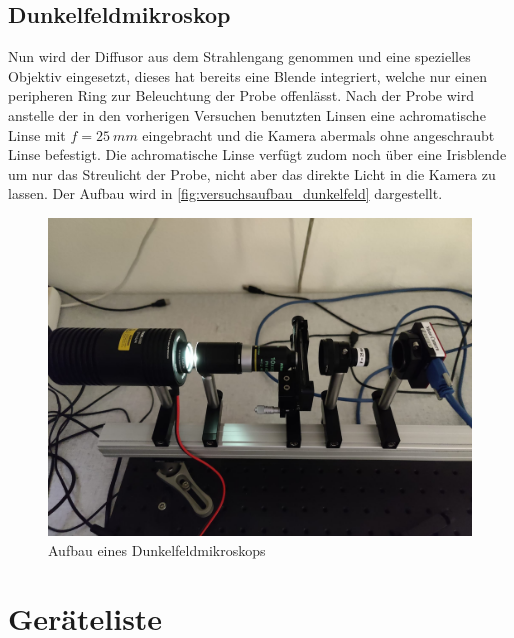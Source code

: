 \documentclass[ngerman]{scrartcl}
\begin{document}
\subsection{Dunkelfeldmikroskop}
Nun wird der Diffusor aus dem Strahlengang genommen und eine spezielles Objektiv eingesetzt, dieses hat bereits eine Blende integriert, welche nur einen peripheren Ring zur Beleuchtung der Probe offenlässt. Nach der Probe wird anstelle der in den vorherigen Versuchen benutzten Linsen eine achromatische Linse mit $f = \SI{25}{mm}$ eingebracht und die Kamera abermals ohne angeschraubt Linse befestigt. Die achromatische Linse verfügt zudom noch über eine Irisblende um nur das Streulicht der Probe, nicht aber das direkte Licht in die Kamera zu lassen. Der Aufbau wird in \autoref{fig:versuchsaufbau_dunkelfeld} dargestellt.
\begin{figure}[H]
    \centering
    \begin{samepage}
        \includegraphics[width=\linewidth]{fig/Dunkelfeld.jpeg}
        \caption{Aufbau eines Dunkelfeldmikroskops}
        \label{fig:versuchsaufbau_dunkelfeld}
    \end{samepage}
\end{figure}

\section{Geräteliste}
\label{sec:geraeteliste}
\end{document}
